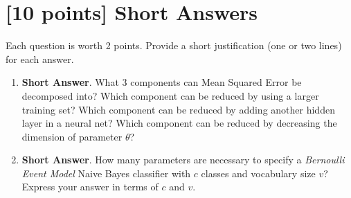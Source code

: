\documentclass{article}
\newif\ifsolutions
\newenvironment{labelledanswer}{{\bf Answer:} \sf }{}%
\newcommand{\answer}[2]
{{
\ifsolutions
\begin{labelledanswer}
\color{red} 
#2
\end{labelledanswer}
\else
#1
\fi
}}
\begin{document}
\clearpage

\section{[10 points] Short Answers}

Each question is worth 2 points. Provide a short justification (one or two lines) for each answer.

\begin{enumerate}

\item \textbf{Short Answer}. 
What 3 components can Mean Squared Error be decomposed into? Which component can be reduced by using a larger training set? Which component can be reduced by adding another hidden layer in a neural net? Which component can be reduced by decreasing the dimension of parameter $\theta$?

\answer{}{
MSE =  Irreducible Error+ Bias$^2$ + Variance\\

Which component can be reduced by using a larger training set? Variance. This leads to the model potentially reduce the gap between cross-validation error and training error through learning from more examples.  \\
Which component can be reduced by adding another hidden layer in a neural net?  Bias. The model is now bigger and more complicated, leading it to learn more pontentially from its current set of features. Training error might be lower, indicating lower bias.\\
Which component can be reduced by decreasing the dimension of parameter $\theta$? This action would means that the parameter would have less expressive power. Depending on the data, this might cause it to perform worse on training error. An example if we're reducing parameters to 1 dimension, but we're predicting data that's much better expressed in 3 dimensions. Therefore, this seems to increase bias which might result in increase in variance. \\
}

\item \textbf{Short Answer}. 
How many parameters are necessary to specify a \emph{Bernoulli Event Model} Naive Bayes classifier with $c$ classes and vocabulary size $v$? Express your answer in terms of $c$ and $v$.

\answer{}{We would need $v\times c$ parameters in total to represent the probabilty for $c$ classes for each of words in vocabulary $v$.}


\end{enumerate}
\end{document}
